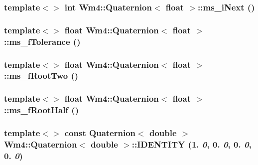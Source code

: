 \subsubsection{\setlength{\rightskip}{0pt plus 5cm}template$<$$>$ int {\bf Wm4::Quaternion}$<$ float $>$::ms\_\-i\-Next ()}\label{classWm4_1_1Quaternion_05174ba9862ca907a5185a11a7e2e389}


\subsubsection{\setlength{\rightskip}{0pt plus 5cm}template$<$$>$ float {\bf Wm4::Quaternion}$<$ float $>$::ms\_\-f\-Tolerance ()}\label{classWm4_1_1Quaternion_304f7d71a3b92582ce046bd540f0456a}


\subsubsection{\setlength{\rightskip}{0pt plus 5cm}template$<$$>$ float {\bf Wm4::Quaternion}$<$ float $>$::ms\_\-f\-Root\-Two ()}\label{classWm4_1_1Quaternion_76fd0e480dae5ecbfc91469cf0180019}


\subsubsection{\setlength{\rightskip}{0pt plus 5cm}template$<$$>$ float {\bf Wm4::Quaternion}$<$ float $>$::ms\_\-f\-Root\-Half ()}\label{classWm4_1_1Quaternion_a12eaa9511019cee51455f1fff46db9a}


\subsubsection{\setlength{\rightskip}{0pt plus 5cm}template$<$$>$ const {\bf Quaternion}$<$ double $>$ {\bf Wm4::Quaternion}$<$ double $>$::{\bf IDENTITY} (1. {\em 0}, 0. {\em 0}, 0. {\em 0}, 0. {\em 0})}\label{classWm4_1_1Quaternion_1a238f807517d926827e5c1b0e5ff29b}


